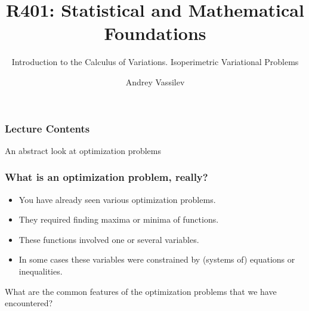\documentclass[10pt]{beamer}
\title{R401: Statistical and Mathematical Foundations \bigskip}
\subtitle{\textcolor{myred}{Introduction to the Calculus of Variations. Isoperimetric Variational Problems}}
\author{Andrey Vassilev}
\date{}
\theoremstyle{definition}
\begin{document}
\maketitle



\begin{frame}[fragile]
\frametitle{Lecture Contents}
\tableofcontents
\end{frame}

\begin{section}{An abstract look at optimization problems}\label{sec:abstr}
\begin{frame}[fragile]
\frametitle{What is an optimization problem, really?}
\begin{itemize} \itemsep1em
\item You have already seen various optimization problems.
\item They required finding maxima or minima of functions.
\item These functions involved one or several variables.
\item In some cases these variables were constrained by (systems of) equations or inequalities.
\end{itemize}\bigskip \pause

\alert{What are the common features of the optimization problems that we have encountered?}
\end{frame}


\end{section}
\end{document}

